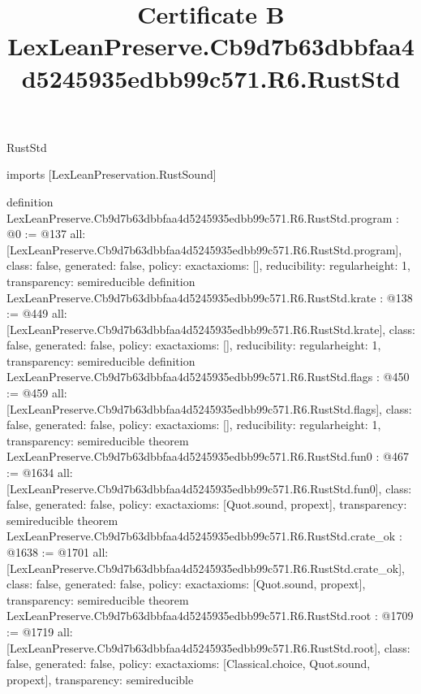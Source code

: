 \begin{lexlean}{RustStd}
\title{Certificate B LexLeanPreserve.Cb9d7b63dbbfaa4d5245935edbb99c571.R6.RustStd}
\begin{coremodule}
imports [LexLeanPreservation.RustSound]

definition LexLeanPreserve.Cb9d7b63dbbfaa4d5245935edbb99c571.R6.RustStd.program : @0 := @137 {
  all: [LexLeanPreserve.Cb9d7b63dbbfaa4d5245935edbb99c571.R6.RustStd.program],
  class: false,
  generated: false,
  policy: exact{axioms: []},
  reducibility: regular{height: 1},
  transparency: semireducible
}
definition LexLeanPreserve.Cb9d7b63dbbfaa4d5245935edbb99c571.R6.RustStd.krate : @138 := @449 {
  all: [LexLeanPreserve.Cb9d7b63dbbfaa4d5245935edbb99c571.R6.RustStd.krate],
  class: false,
  generated: false,
  policy: exact{axioms: []},
  reducibility: regular{height: 1},
  transparency: semireducible
}
definition LexLeanPreserve.Cb9d7b63dbbfaa4d5245935edbb99c571.R6.RustStd.flags : @450 := @459 {
  all: [LexLeanPreserve.Cb9d7b63dbbfaa4d5245935edbb99c571.R6.RustStd.flags],
  class: false,
  generated: false,
  policy: exact{axioms: []},
  reducibility: regular{height: 1},
  transparency: semireducible
}
theorem LexLeanPreserve.Cb9d7b63dbbfaa4d5245935edbb99c571.R6.RustStd.fun0 : @467 := @1634 {
  all: [LexLeanPreserve.Cb9d7b63dbbfaa4d5245935edbb99c571.R6.RustStd.fun0],
  class: false,
  generated: false,
  policy: exact{axioms: [Quot.sound, propext]},
  transparency: semireducible
}
theorem LexLeanPreserve.Cb9d7b63dbbfaa4d5245935edbb99c571.R6.RustStd.crate_ok : @1638 := @1701 {
  all: [LexLeanPreserve.Cb9d7b63dbbfaa4d5245935edbb99c571.R6.RustStd.crate_ok],
  class: false,
  generated: false,
  policy: exact{axioms: [Quot.sound, propext]},
  transparency: semireducible
}
theorem LexLeanPreserve.Cb9d7b63dbbfaa4d5245935edbb99c571.R6.RustStd.root : @1709 := @1719 {
  all: [LexLeanPreserve.Cb9d7b63dbbfaa4d5245935edbb99c571.R6.RustStd.root],
  class: false,
  generated: false,
  policy: exact{axioms: [Classical.choice, Quot.sound, propext]},
  transparency: semireducible
}


\end{coremodule}
\end{lexlean}
